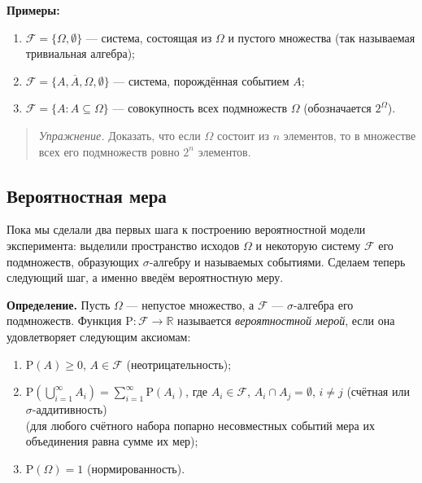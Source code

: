 \documentclass[11pt,a4paper]{article}
\providecommand{\tightlist}{%
      \setlength{\itemsep}{0pt}\setlength{\parskip}{0pt}}
\begin{document}
\textbf{Примеры:}

\begin{enumerate}
\def\labelenumi{\arabic{enumi}.}
\tightlist
\item
  \(\mathcal{F} = \{ \Omega, \emptyset \}\) --- система, состоящая из
  \(\Omega\) и пустого множества (так называемая тривиальная алгебра);
\item
  \(\mathcal{F} = \{ A, \overline{A}, \Omega, \emptyset \}\) ---
  система, порождённая событием \(A\);
\item
  \(\mathcal{F} = \{ A: A \subseteq \Omega \}\) --- совокупность всех
  подмножеств \(\Omega\) (обозначается \(2^\Omega\)).
\end{enumerate}

\begin{quote}
\emph{Упражнение.} Доказать, что если \(\Omega\) состоит из \(n\)
элементов, то в множестве всех его подмножеств ровно \(2^n\) элементов.
\end{quote}

    \hypertarget{ux432ux435ux440ux43eux44fux442ux43dux43eux441ux442ux43dux430ux44f-ux43cux435ux440ux430}{%
\subsection{Вероятностная
мера}\label{ux432ux435ux440ux43eux44fux442ux43dux43eux441ux442ux43dux430ux44f-ux43cux435ux440ux430}}

Пока мы сделали два первых шага к построению вероятностной модели
эксперимента: выделили пространство исходов \(\Omega\) и некоторую
систему \(\mathcal{F}\) его подмножеств, образующих \(\sigma\)-алгебру и
называемых событиями. Сделаем теперь следующий шаг, а именно введём
вероятностную меру.

\textbf{Определение.} Пусть \(\Omega\) --- непустое множество, а
\(\mathcal{F}\) --- \(\sigma\)-алгебра его подмножеств. Функция
\(\mathrm{P}: \mathcal{F} \rightarrow \mathbb{R}\) называется
\emph{вероятностной мерой}, если она удовлетворяет следующим аксиомам:

\begin{enumerate}
\def\labelenumi{\arabic{enumi}.}
\tightlist
\item
  \(\mathrm{P}(A) \ge 0\), \(A \in \mathcal{F}\) (неотрицательность);
\item
  \(\mathrm{P}\left( \bigcup\limits_{i=1}^{\infty}A_i \right) = \sum\limits_{i=1}^{\infty}\mathrm{P}(A_i)\),
  где \(A_i \in \mathcal{F}\), \(A_i \cap A_j = \emptyset\), \(i \ne j\)
  (счётная или \(\sigma\)-аддитивность)\\
  (для любого счётного набора попарно несовместных событий мера их
  объединения равна сумме их мер);
\item
  \(\mathrm{P}(\Omega) = 1\) (нормированность).
\end{enumerate}
\end{document}
